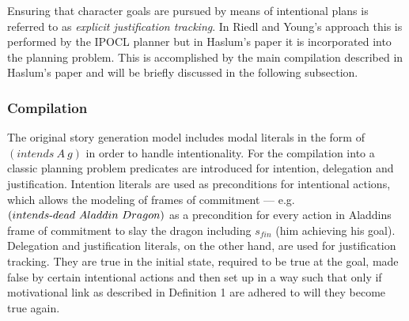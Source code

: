 Ensuring that character goals are pursued by means of intentional plans is referred to as \emph{explicit justification tracking}. In Riedl and Young's approach \cite{Riedl10} this is performed by the IPOCL planner but in Haslum's paper \cite{Haslum14} it is incorporated into the planning problem. This is accomplished by the main compilation described in Haslum's paper \cite{Haslum14} and will be briefly discussed in the following subsection.

\subsubsection{Compilation}
The original story generation model includes modal literals in the form of $(intends\ A\ g)$ in order to handle intentionality. For the compilation into a classic planning problem predicates are introduced for intention, delegation and justification. Intention literals are used as preconditions for intentional actions, which allows the modeling of frames of commitment --- e.g. $(intends\h dead\ Aladdin\ Dragon)$ as a precondition for every action in Aladdins frame of commitment to slay the dragon including $s_{fin}$ (him achieving his goal). Delegation and justification literals, on the other hand, are used for justification tracking. They are true in the initial state, required to be true at the goal, made false by certain intentional actions and then set up in a way such that only if motivational link as described in Definition 1 are adhered to will they become true again.

